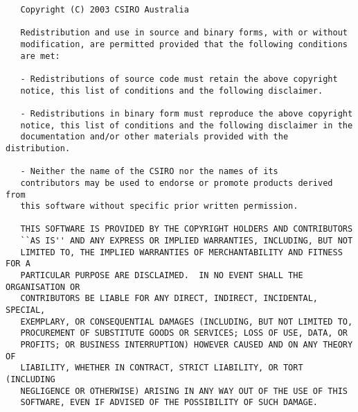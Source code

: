 \footnotesize\begin{verbatim}   Copyright (C) 2003 CSIRO Australia

   Redistribution and use in source and binary forms, with or without
   modification, are permitted provided that the following conditions
   are met:
   
   - Redistributions of source code must retain the above copyright
   notice, this list of conditions and the following disclaimer.
   
   - Redistributions in binary form must reproduce the above copyright
   notice, this list of conditions and the following disclaimer in the
   documentation and/or other materials provided with the distribution.
   
   - Neither the name of the CSIRO nor the names of its
   contributors may be used to endorse or promote products derived from
   this software without specific prior written permission.
   
   THIS SOFTWARE IS PROVIDED BY THE COPYRIGHT HOLDERS AND CONTRIBUTORS
   ``AS IS'' AND ANY EXPRESS OR IMPLIED WARRANTIES, INCLUDING, BUT NOT
   LIMITED TO, THE IMPLIED WARRANTIES OF MERCHANTABILITY AND FITNESS FOR A
   PARTICULAR PURPOSE ARE DISCLAIMED.  IN NO EVENT SHALL THE ORGANISATION OR
   CONTRIBUTORS BE LIABLE FOR ANY DIRECT, INDIRECT, INCIDENTAL, SPECIAL,
   EXEMPLARY, OR CONSEQUENTIAL DAMAGES (INCLUDING, BUT NOT LIMITED TO,
   PROCUREMENT OF SUBSTITUTE GOODS OR SERVICES; LOSS OF USE, DATA, OR
   PROFITS; OR BUSINESS INTERRUPTION) HOWEVER CAUSED AND ON ANY THEORY OF
   LIABILITY, WHETHER IN CONTRACT, STRICT LIABILITY, OR TORT (INCLUDING
   NEGLIGENCE OR OTHERWISE) ARISING IN ANY WAY OUT OF THE USE OF THIS
   SOFTWARE, EVEN IF ADVISED OF THE POSSIBILITY OF SUCH DAMAGE.

\end{verbatim}
\normalsize
 